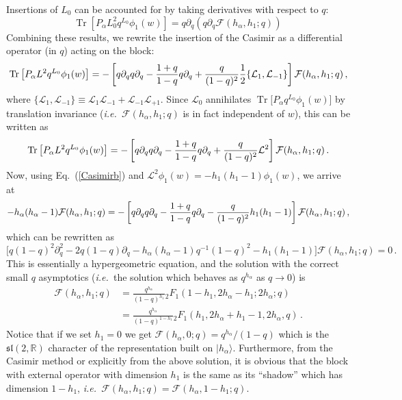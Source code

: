 \documentclass[12pt]{article}
\newcommand{\sltwo}{$\lie{sl}(2,\RR)$ }
\def\Lc{\mathcal{L}}
\def\p{\partial}
\newcommand{\bea}{\begin{eqnarray}}
\newcommand{\eea}{\end{eqnarray}}
\newcommand{\RR}{\mathbb{R}}
\newcommand{\ie}{{\it i.e.~}}
\newcommand{\lie}[1]{\mathfrak{#1}}
\DeclareMathOperator{\Tr}{Tr}
\begin{document}
%
Insertions of $L_0$ can be accounted for by taking derivatives with respect to $q$:
%
\begin{equation}
 \Tr \left[
 P_\alpha L_0^2 q^{L_0} \phi_1(w)
 \right] =q\p_q \left( q \p_q
   \mathcal{F}(h_{\alpha},h_1;q)
 \right)\,
\end{equation}
%
Combining these results, we rewrite the insertion of the Casimir as a differential operator (in $q$) acting on the block:
%
\bea
 \Tr \big[P_\alpha L^2 q^{L_0} \phi_1(w)\big]
 = -\left[ q\p_q  q \p_q  -{1+q\over 1-q}q\p_q   +{q\over (1-q)^2} {1\over 2}\{ \Lc_1,\Lc_{-1}\}\right]
    \mathcal{F}(h_{\alpha},h_1;q)
    \,,
\eea where $\{ \Lc_1,\Lc_{-1}\} \equiv \Lc_1 \Lc_{-1}  + \Lc_{-1} \Lc_{+1}$.
%
Since $\Lc_0$ annihilates $\Tr\big[ P_\alpha q^{L_0} \phi_1(w)\big]$ by translation invariance (\ie $\mathcal{F}(h_{\alpha},h_1;q)
   $ is in fact independent of $w$), this can be written as
%
\begin{equation}
\Tr \big[P_\alpha L^2 q^{L_0} \phi_1(w)\big]
= -\left[ q\p_q  q \p_q  -{1+q\over 1-q}q\p_q   +{q\over (1-q)^2} \Lc^2\right]
    \mathcal{F}(h_{\alpha},h_1;q)\,.
\end{equation}
%
Now, using Eq.~(\ref{Casimirb}) and $\Lc^2 \phi_1(w)=-h_1(h_1-1)\phi_1(w)$,  we arrive at
%
\begin{equation}
-h_\alpha(h_\alpha-1)   \mathcal{F}(h_{\alpha},h_1;q)
  = -\left[ q\p_q  q \p_q  -{1+q\over 1-q}q\p_q   -{q\over (1-q)^2} h_1(h_1-1)\right]
      \mathcal{F}(h_{\alpha},h_1;q)\,,
\end{equation}
%
which can be rewritten as
%
\begin{equation}\label{diffeq}
\Big[  q(1-q)^2\p_q^2 -2q(1-q)\p_q -h_\alpha(h_\alpha-1)q^{-1}(1-q)^2 -h_1(h_1-1)\Big]  \mathcal{F}(h_{\alpha},h_1;q)=0\,.
\end{equation}
%
This is essentially a hypergeometric equation, and the  solution with the correct small $q$ asymptotics
(\ie the solution which behaves as $q^{h_{\alpha}}$ as $q\rightarrow 0$)  is
%
\begin{align}
    \mathcal{F}(h_{\alpha},h_1;q) &= \frac{q^{h_\alpha} }{ (1-q)^{h_1}} {}_2F_1(1-h_1,2h_\alpha-h_1;2h_\alpha;q) \nonumber \\
    &=\frac{ q^{h_\alpha} }{ (1-q)^{1-h_1} } {}_2F_1(h_1,2h_\alpha+h_1-1,2h_\alpha,q)\,.
\end{align}
%
Notice that if we set $h_1=0$ we get $ \mathcal{F}(h_{\alpha},0;q)= q^{h_{\alpha}}/ (1-q)$ which is the \sltwo  character of the representation built on $|h_\alpha\rangle$. Furthermore, from the Casimir method or explicitly from the above solution, it is obvious that the block with external operator with dimension $h_1$ is the same as its ``shadow''
which has dimension $1-h_1$, \ie $ \mathcal{F}(h_{\alpha},h_1;q)= \mathcal{F}(h_{\alpha},1-h_1;q)$.
\end{document}
